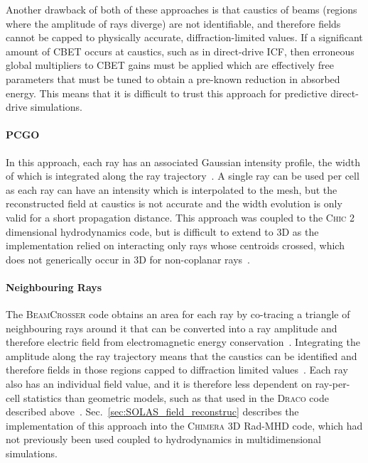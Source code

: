 Another drawback of both of these approaches is that caustics of beams (regions where the amplitude of rays diverge) are not identifiable, and therefore fields cannot be capped to physically accurate, diffraction-limited values.
If a significant amount of \ac{CBET} occurs at caustics, such as in direct-drive \ac{ICF}, then erroneous global multipliers to \ac{CBET} gains must be applied which are effectively free parameters that must be tuned to obtain a pre-known reduction in absorbed energy.
This means that it is difficult to trust this approach for predictive direct-drive simulations.

\paragraph*{\ac{PCGO}} In this approach, each ray has an associated Gaussian intensity profile, the width of which is integrated along the ray trajectory~\cite{colaitis_towards_2014,colaitis_crossed_2016}.
A single ray can be used per cell as each ray can have an intensity which is interpolated to the mesh, but the reconstructed field at caustics is not accurate and the width evolution is only valid for a short propagation distance.
This approach was coupled to the \textsc{Chic} 2 dimensional hydrodynamics code, but is difficult to extend to 3D as the implementation relied on interacting only rays whose centroids crossed, which does not generically occur in 3D for non-coplanar rays~\cite{colaitis_modeling_2015}.

\paragraph*{Neighbouring Rays} The \textsc{BeamCrosser} code obtains an area for each ray by co-tracing a triangle of neighbouring rays around it that can be converted into a ray amplitude and therefore electric field from electromagnetic energy conservation~\cite{edgell_mitigation_2017}.
Integrating the amplitude along the ray trajectory means that the caustics can be identified and therefore fields in those regions capped to diffraction limited values~\cite{follett_ray-based_2018}.
Each ray also has an individual field value, and it is therefore less dependent on ray-per-cell statistics than geometric models, such as that used in the \textsc{Draco} code described above~\cite{follett_validation_2022}.
Sec.~\ref{sec:SOLAS_field_reconstruc} describes the implementation of this approach into the \textsc{Chimera} 3D \ac{Rad-MHD} code, which had not previously been used coupled to hydrodynamics in multidimensional simulations.


